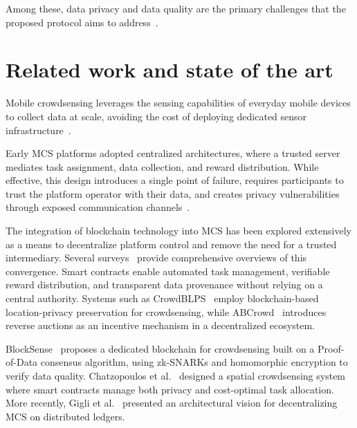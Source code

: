 Among these, data privacy and data quality are the primary challenges that the proposed protocol aims to address~\cite{ganti2011mobile, lane2010survey}.

\section{Related work and state of the art} \label{sec:related-work}
Mobile crowdsensing leverages the sensing capabilities of everyday
mobile devices to collect data at scale, avoiding the cost of deploying
dedicated sensor infrastructure~\cite{capponi2019survey}.

Early MCS platforms adopted centralized architectures, where a trusted server mediates
task assignment, data collection, and reward distribution.
While effective, this design introduces a single point of failure, requires participants to
trust the platform operator with their data, and creates privacy
vulnerabilities through exposed communication channels~\cite{chen2021survey}.

The integration of blockchain technology into MCS has been explored
extensively as a means to decentralize platform control and remove the need
for a trusted intermediary.
Several surveys~\cite{chen2021survey, yu2023blockchain} provide
comprehensive overviews of this convergence.
Smart contracts enable automated task management, verifiable reward distribution, and transparent data
provenance without relying on a central authority.
Systems such as CrowdBLPS~\cite{zou2019crowdblps} employ blockchain-based
location-privacy preservation for crowdsensing, while ABCrowd~\cite{kadadha2020abcrowd} introduces reverse auctions
as an incentive mechanism in a decentralized ecosystem.

BlockSense~\cite{huang2022blocksense} proposes a dedicated blockchain
for crowdsensing built on a Proof-of-Data consensus algorithm, using
zk-SNARKs and homomorphic encryption to verify data quality.
Chatzopoulos et al.~\cite{chatzopoulos2018privacy} designed a spatial
crowdsensing system where smart contracts manage both privacy and
cost-optimal task allocation.
More recently, Gigli et al.~\cite{gigli2024decentralization} presented an architectural
vision for decentralizing MCS on distributed ledgers.

